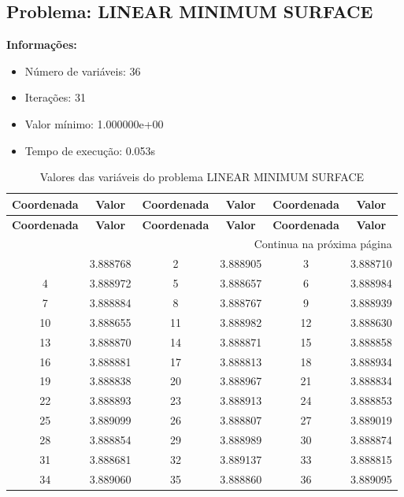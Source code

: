 \documentclass[12pt]{article}
\begin{document}
\newpage            
\subsection{Problema: LINEAR MINIMUM SURFACE}

\textbf{Informações:}
\begin{itemize}
\item Número de variáveis: 36
\item Iterações: 31
\item Valor mínimo: 1.000000e+00
\item Tempo de execução: 0.053s
\end{itemize}

\small
\begin{longtable}{@{}cc|cc|cc@{}}
\caption{Valores das variáveis do problema LINEAR MINIMUM SURFACE} \\
\toprule
\textbf{Coordenada} & \textbf{Valor} & \textbf{Coordenada} & \textbf{Valor} & \textbf{Coordenada} & \textbf{Valor} \\
\midrule
\endfirsthead

\toprule
\textbf{Coordenada} & \textbf{Valor} & \textbf{Coordenada} & \textbf{Valor} & \textbf{Coordenada} & \textbf{Valor} \\
\midrule
\endhead

\midrule \multicolumn{6}{r}{{Continua na próxima página}} \\ \midrule
\endfoot

\bottomrule
\endlastfoot
1 & 3.888768 & 2 & 3.888905 & 3 & 3.888710 \\
4 & 3.888972 & 5 & 3.888657 & 6 & 3.888984 \\
7 & 3.888884 & 8 & 3.888767 & 9 & 3.888939 \\
10 & 3.888655 & 11 & 3.888982 & 12 & 3.888630 \\
13 & 3.888870 & 14 & 3.888871 & 15 & 3.888858 \\
16 & 3.888881 & 17 & 3.888813 & 18 & 3.888934 \\
19 & 3.888838 & 20 & 3.888967 & 21 & 3.888834 \\
22 & 3.888893 & 23 & 3.888913 & 24 & 3.888853 \\
25 & 3.889099 & 26 & 3.888807 & 27 & 3.889019 \\
28 & 3.888854 & 29 & 3.888989 & 30 & 3.888874 \\
31 & 3.888681 & 32 & 3.889137 & 33 & 3.888815 \\
34 & 3.889060 & 35 & 3.888860 & 36 & 3.889095 \\

\end{longtable}
\end{document}
